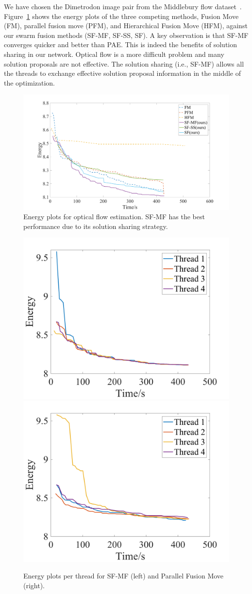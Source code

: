 
\noindent
%
We have chosen the Dimetrodon image pair from the Middlebury flow
dataset~\cite{middlebury_flow}. Figure~\ref{fig:optical_flow_convergence}
shows the energy plots of the three competing methods, Fusion Move
(FM), parallel fusion move (PFM), and Hierarchical Fusion Move (HFM),
against our swarm fusion methods (SF-MF, SF-SS, SF). A key observation
is that SF-MF converges quicker and better than PAE. This is indeed the
benefits of solution sharing in our network. Optical flow is a more
difficult problem and many solution proposals are not effective.
The solution sharing (i.e., SF-MF) allows all the threads to exchange
effective solution proposal information in the middle of the
optimization.
\begin{figure}[tb]
  \includegraphics[width=\columnwidth]{figure/optical_flow_convergence.png}
  \caption{Energy plots for optical flow estimation. SF-MF has the best
 performance due to its solution sharing strategy.}\label{fig:optical_flow_convergence}
\end{figure}
\begin{figure}[tb]
  \includegraphics[width=0.5\columnwidth]{figure/optical_flow_SF_MF_threads.png}
  \includegraphics[width=0.5\columnwidth]{figure/optical_flow_PFM_threads.png}
 \caption{Energy plots per thread for SF-MF (left) and Parallel Fusion
 Move (right).}\label{fig:optical_flow_by_threads}
\end{figure}
